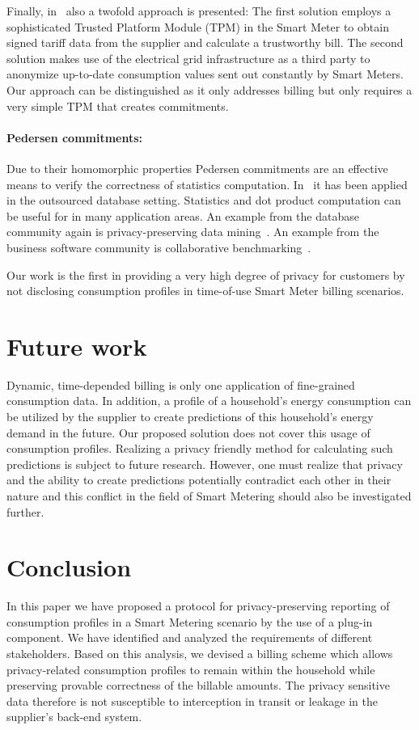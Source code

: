 \documentclass[english]{llncs}
\begin{document}
Finally, in~\cite{privconcept} also a twofold approach is presented: The first solution employs a sophisticated Trusted Platform Module (TPM) in the Smart Meter to obtain signed tariff data from the supplier and calculate a trustworthy bill. The second solution makes use of the electrical grid infrastructure as a third party to anonymize up-to-date consumption values sent out constantly by Smart Meters. Our approach can be distinguished as it only addresses billing but only requires a very simple TPM that creates commitments. 


\paragraph{Pedersen commitments:}
Due to their homomorphic properties Pedersen commitments are an effective means to verify the correctness of statistics computation.
In~\cite{ThoYao} it has been applied in the outsourced database setting.
Statistics and dot product computation can be useful for in many application areas.
An example from the database community again is privacy-preserving data mining~\cite{VaJZhu}.
An example from the business software community is collaborative benchmarking~\cite{Ker}.

Our work is the first in providing a very high degree of privacy for customers by not disclosing consumption profiles in time-of-use Smart Meter billing scenarios.

\section{Future work}
\label{futurework}
Dynamic, time-depended billing is only one application of fine-grained consumption data. In addition, 
a profile of a household's energy consumption can be utilized by the supplier to create predictions of this household's energy demand in the future. Our proposed solution does not cover this usage of consumption profiles. 
Realizing a privacy friendly method for calculating such predictions is subject to future research. 
However, one must realize that privacy and the ability to create predictions potentially contradict each other in their nature and this conflict in the field of Smart Metering should also be investigated further.



\section{Conclusion}
\label{conclusion}
In this paper we have proposed a protocol for privacy-preserving reporting of consumption profiles in a Smart Metering scenario by the use of a plug-in component. We have identified and analyzed the requirements of different stakeholders. Based on this analysis, we devised a billing scheme  which allows privacy-related consumption profiles to remain within the household while preserving provable correctness of the billable amounts. 
The privacy sensitive data therefore is not susceptible to interception in transit or leakage in the supplier's back-end system. 
\end{document}
